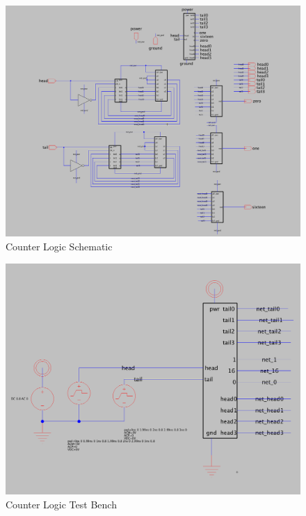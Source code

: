 \documentclass[a4paper]{article}
\begin{document}
\begin{figure}[H]
	\centering
	\includegraphics[scale=0.26]{counterLogic}
	\caption{Counter Logic Schematic}
	\label{fig:counterLogic}
\end{figure}

\begin{figure}[H]
	\centering
	\includegraphics[scale=0.26]{counterLogicTest}
	\caption{Counter Logic Test Bench}
	\label{fig:counterLogicTest}
\end{figure}
\end{document}
